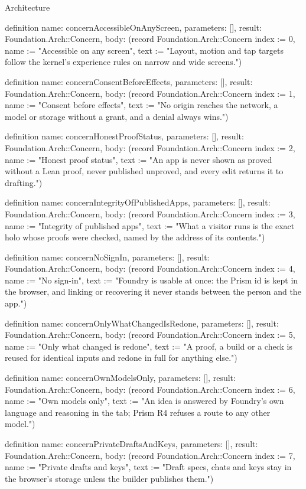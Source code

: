 \begin{lexlean}{Architecture}
\begin{semanticmodule}
definition{
  name: concernAccessibleOnAnyScreen,
  parameters: [],
  result: Foundation.Arch::Concern,
  body: (record Foundation.Arch::Concern {index := 0, name := "Accessible on any screen", text := "Layout, motion and tap targets follow the kernel's experience rules on narrow and wide screens."})
}

definition{
  name: concernConsentBeforeEffects,
  parameters: [],
  result: Foundation.Arch::Concern,
  body: (record Foundation.Arch::Concern {index := 1, name := "Consent before effects", text := "No origin reaches the network, a model or storage without a grant, and a denial always wins."})
}

definition{
  name: concernHonestProofStatus,
  parameters: [],
  result: Foundation.Arch::Concern,
  body: (record Foundation.Arch::Concern {index := 2, name := "Honest proof status", text := "An app is never shown as proved without a Lean proof, never published unproved, and every edit returns it to drafting."})
}

definition{
  name: concernIntegrityOfPublishedApps,
  parameters: [],
  result: Foundation.Arch::Concern,
  body: (record Foundation.Arch::Concern {index := 3, name := "Integrity of published apps", text := "What a visitor runs is the exact holo whose proofs were checked, named by the address of its contents."})
}

definition{
  name: concernNoSignIn,
  parameters: [],
  result: Foundation.Arch::Concern,
  body: (record Foundation.Arch::Concern {index := 4, name := "No sign-in", text := "Foundry is usable at once: the Prism id is kept in the browser, and linking or recovering it never stands between the person and the app."})
}

definition{
  name: concernOnlyWhatChangedIsRedone,
  parameters: [],
  result: Foundation.Arch::Concern,
  body: (record Foundation.Arch::Concern {index := 5, name := "Only what changed is redone", text := "A proof, a build or a check is reused for identical inputs and redone in full for anything else."})
}

definition{
  name: concernOwnModelsOnly,
  parameters: [],
  result: Foundation.Arch::Concern,
  body: (record Foundation.Arch::Concern {index := 6, name := "Own models only", text := "An idea is answered by Foundry's own language and reasoning in the tab; Prism R4 refuses a route to any other model."})
}

definition{
  name: concernPrivateDraftsAndKeys,
  parameters: [],
  result: Foundation.Arch::Concern,
  body: (record Foundation.Arch::Concern {index := 7, name := "Private drafts and keys", text := "Draft specs, chats and keys stay in the browser's storage unless the builder publishes them."})
}


\end{semanticmodule}
\end{lexlean}

